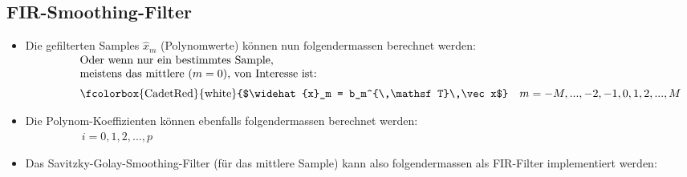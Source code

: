	\subsection{FIR-Smoothing-Filter}
		\begin{itemize}
		 \item Die gefilterten Samples $\widehat x_m$ (Polynomwerte) können nun folgendermassen berechnet werden:\\[0.2cm]
		 $\qquad\qquad$
		 $\begin{array}{l}\text{Oder wenn nur ein bestimmtes Sample,}\\\text{meistens das mittlere $(m=0)$, von Interesse ist:}\\[0.2cm]\text{\fcolorbox{CadetRed}{white}{$\widehat{x}_m = b_m^{\,\mathsf T}\,\vec x$}$\quad m = -M,...,-2,-1,0,1,2,...,M$}\end{array}$\\[-0.1cm]
		 \item Die Polynom-Koeffizienten können ebenfalls folgendermassen berechnet werden:\\[0.2cm]
		 $\qquad\qquad$$\quad i = 0,1,2,...,p$\\[-0.1cm]
		 \item Das Savitzky-Golay-Smoothing-Filter (für das mittlere Sample) kann also folgendermassen als FIR-Filter implementiert werden:\\[0.2cm]
		 \\[0.3cm]

\end{itemize}
